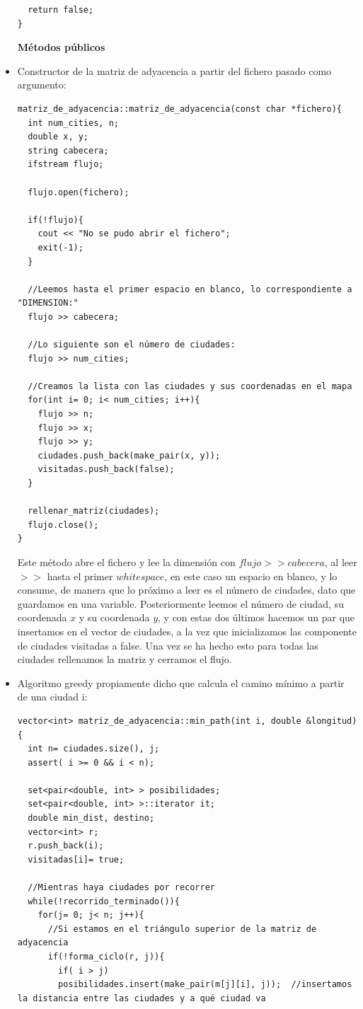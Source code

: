 \documentclass[12pt]{article}
\begin{document}
\begin{itemize}
\begin{lstlisting}
  return false;
}
\end{lstlisting}

\item[\textbf{Métodos públicos}]
\item Constructor de la matriz de adyacencia a partir del fichero pasado como argumento: 
\begin{lstlisting}
matriz_de_adyacencia::matriz_de_adyacencia(const char *fichero){
  int num_cities, n;
  double x, y;
  string cabecera;
  ifstream flujo;

  flujo.open(fichero);

  if(!flujo){
    cout << "No se pudo abrir el fichero";
    exit(-1);
  }

  //Leemos hasta el primer espacio en blanco, lo correspondiente a "DIMENSION:"
  flujo >> cabecera;

  //Lo siguiente son el número de ciudades:
  flujo >> num_cities;

  //Creamos la lista con las ciudades y sus coordenadas en el mapa
  for(int i= 0; i< num_cities; i++){
    flujo >> n;
    flujo >> x;
    flujo >> y;
    ciudades.push_back(make_pair(x, y));
    visitadas.push_back(false);
  }

  rellenar_matriz(ciudades);
  flujo.close();
}
\end{lstlisting}
Este método abre el fichero y lee la dimensión con $flujo >> cabecera$, al leer $>>$ hasta el primer $whitespace$, en este caso un espacio en blanco, y lo consume, de manera que lo próximo a leer es el número de ciudades, dato que guardamos en una variable. Posteriormente leemos el número de ciudad, su coordenada $x$ y su coordenada $y$, y con estas dos últimos hacemos un par que insertamos en el vector de ciudades, a la vez que inicializamos las componente de ciudades visitadas a false. Una vez se ha hecho esto para todas las ciudades rellenamos la matriz y cerramos el flujo.

\item Algoritmo greedy propiamente dicho que calcula el camino mínimo a partir de una ciudad i: 
\begin{lstlisting}
vector<int> matriz_de_adyacencia::min_path(int i, double &longitud){
  int n= ciudades.size(), j;
  assert( i >= 0 && i < n);

  set<pair<double, int> > posibilidades;
  set<pair<double, int> >::iterator it;
  double min_dist, destino;
  vector<int> r;
  r.push_back(i);
  visitadas[i]= true;

  //Mientras haya ciudades por recorrer
  while(!recorrido_terminado()){
    for(j= 0; j< n; j++){
      //Si estamos en el triángulo superior de la matriz de adyacencia
      if(!forma_ciclo(r, j)){
        if( i > j)
        posibilidades.insert(make_pair(m[j][i], j));  //insertamos la distancia entre las ciudades y a qué ciudad va


\end{lstlisting}
\end{itemize}
\end{document}
